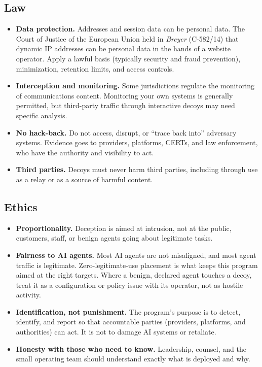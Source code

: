 \documentclass[11pt,letterpaper]{article}
\begin{document}
\subsection{Law}
\label{sec:law}

\begin{itemize}
  \item \textbf{Data protection.} Addresses and session data can be personal data. The Court of Justice of the European Union held in \emph{Breyer} (C-582/14) that dynamic IP addresses can be personal data in the hands of a website operator. Apply a lawful basis (typically security and fraud prevention), minimization, retention limits, and access controls.
  \item \textbf{Interception and monitoring.} Some jurisdictions regulate the monitoring of communications content. Monitoring your own systems is generally permitted, but third-party traffic through interactive decoys may need specific analysis.
  \item \textbf{No hack-back.} Do not access, disrupt, or ``trace back into'' adversary systems. Evidence goes to providers, platforms, CERTs, and law enforcement, who have the authority and visibility to act.
  \item \textbf{Third parties.} Decoys must never harm third parties, including through use as a relay or as a source of harmful content.
\end{itemize}

\subsection{Ethics}
\label{sec:ethics}

\begin{itemize}
  \item \textbf{Proportionality.} Deception is aimed at intrusion, not at the public, customers, staff, or benign agents going about legitimate tasks.
  \item \textbf{Fairness to AI agents.} Most AI agents are not misaligned, and most agent traffic is legitimate. Zero-legitimate-use placement is what keeps this program aimed at the right targets. Where a benign, declared agent touches a decoy, treat it as a configuration or policy issue with its operator, not as hostile activity.
  \item \textbf{Identification, not punishment.} The program's purpose is to detect, identify, and report so that accountable parties (providers, platforms, and authorities) can act. It is not to damage AI systems or retaliate.
  \item \textbf{Honesty with those who need to know.} Leadership, counsel, and the small operating team should understand exactly what is deployed and why.
\end{itemize}
\end{document}
